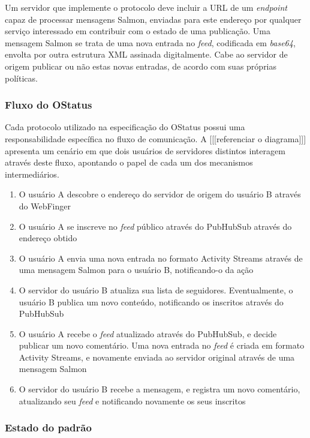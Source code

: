 Um servidor que implemente o protocolo deve incluir a URL de um \textit{endpoint}
capaz de processar mensagens Salmon, enviadas para este endereço por qualquer
serviço interessado em contribuir com o estado de uma publicação. Uma mensagem
Salmon se trata de uma nova entrada no \textit{feed}, codificada em \textit{base64},
envolta por outra estrutura XML assinada digitalmente. Cabe ao servidor de origem
publicar ou não estas novas entradas, de acordo com suas próprias políticas.

\subsubsection{Fluxo do OStatus}

Cada protocolo utilizado na especificação do OStatus possui uma responsabilidade
específica no fluxo de comunicação. A [[[referenciar o diagrama]]] apresenta um
cenário em que dois usuários de servidores distintos interagem através deste fluxo,
apontando o papel de cada um dos mecanismos intermediários.


\begin{enumerate}
  \item{O usuário A descobre o endereço do servidor de origem do usuário B através
        do WebFinger}
  \item{O usuário A se inscreve no \textit{feed} público através do PubHubSub
        através do endereço obtido}
  \item{O usuário A envia uma nova entrada no formato Activity Streams através de
        uma mensagem Salmon para o usuário B, notificando-o da ação}
  \item{O servidor do usuário B atualiza sua lista de seguidores. Eventualmente, o
        usuário B publica um novo conteúdo, notificando os inscritos através do
        PubHubSub}
  \item{O usuário A recebe o \textit{feed} atualizado através do PubHubSub, e decide
        publicar um novo comentário. Uma nova entrada no \textit{feed} é criada em
        formato Activity Streams, e novamente enviada ao servidor original através
        de uma mensagem Salmon}
  \item{O servidor do usuário B recebe a mensagem, e registra um novo comentário,
        atualizando seu \textit{feed} e notificando novamente os seus inscritos}
\end{enumerate}

\subsubsection{Estado do padrão}

